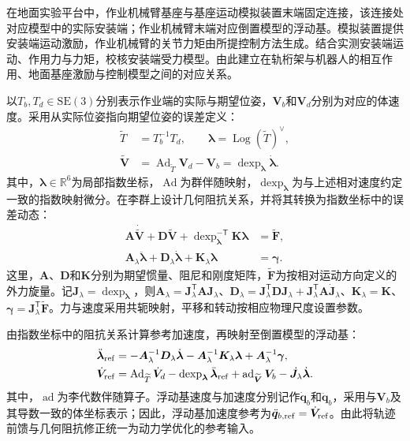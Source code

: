 \documentclass[UTF8,a4paper,zihao=-4,fontset=fandol]{ctexart}
\newcommand{\SE}{\mathrm{SE}(3)}
\begin{document}
在地面实验平台中，作业机械臂基座与基座运动模拟装置末端固定连接，该连接处对应模型中的实际安装端；作业机械臂末端对应倒置模型的浮动基。模拟装置提供安装端运动激励，作业机械臂的关节力矩由所提控制方法生成。结合实测安装端运动、作用力与力矩，校核安装端受力模型。由此建立在轨桁架与机器人的相互作用、地面基座激励与控制模型之间的对应关系。

以$T_b,T_d\in\SE$分别表示作业端的实际与期望位姿，$\bm V_b$和$\bm V_d$分别为对应的体速度。采用从实际位姿指向期望位姿的误差定义：
\begin{equation}
\begin{aligned}
 \widetilde T&=T_b^{-1}T_d,\qquad
 \bm\lambda=\operatorname{Log}(\widetilde T)^\vee,\\
 \widetilde{\bm V}
 &=\operatorname{Ad}_{\widetilde T}\bm V_d-\bm V_b
 =\operatorname{dexp}_{\bm\lambda}\dot{\bm\lambda}.
\end{aligned}
\label{eq:pose_error}
\end{equation}
其中，$\bm\lambda\in\mathbb R^6$为局部指数坐标，$\operatorname{Ad}$为群伴随映射，$\operatorname{dexp}_{\bm\lambda}$为与上述相对速度约定一致的指数映射微分。在李群上设计几何阻抗关系，并将其转换为指数坐标中的误差动态\cite{kim2025}：
\begin{equation}
\begin{aligned}
 \bm A\dot{\widetilde{\bm V}}+\bm D\widetilde{\bm V}
 +\operatorname{dexp}_{\bm\lambda}^{-\mathsf T}\bm K\bm\lambda
 &=\widetilde{\bm F},\\
 \bm A_\lambda\ddot{\bm\lambda}
 +\bm D_\lambda\dot{\bm\lambda}+\bm K_\lambda\bm\lambda
 &=\bm\gamma.
\end{aligned}
\label{eq:impedance}
\end{equation}
这里，$\bm A$、$\bm D$和$\bm K$分别为期望惯量、阻尼和刚度矩阵，$\widetilde{\bm F}$为按相对运动方向定义的外力旋量。记$\bm J_\lambda=\operatorname{dexp}_{\bm\lambda}$，则$\bm A_\lambda=\bm J_\lambda^{\mathsf T}\bm A\bm J_\lambda$、$\bm D_\lambda=\bm J_\lambda^{\mathsf T}\bm D\bm J_\lambda+\bm J_\lambda^{\mathsf T}\bm A\dot{\bm J}_\lambda$、$\bm K_\lambda=\bm K$、$\bm\gamma=\bm J_\lambda^{\mathsf T}\widetilde{\bm F}$。力与速度采用共轭映射，平移和转动按相应物理尺度设置参数。

由指数坐标中的阻抗关系计算参考加速度，再映射至倒置模型的浮动基：
\begin{equation}
\begin{aligned}
 \ddot{\bm\lambda}_{\rm ref}
 &=-\bm A_\lambda^{-1}\bm D_\lambda\dot{\bm\lambda}
   -\bm A_\lambda^{-1}\bm K_\lambda\bm\lambda
   +\bm A_\lambda^{-1}\bm\gamma,\\
 \dot{\bm V}_{\rm ref}
 &=\operatorname{Ad}_{\widetilde T}\dot{\bm V}_d
   -\operatorname{dexp}_{\bm\lambda}\ddot{\bm\lambda}_{\rm ref}
   +\operatorname{ad}_{\widetilde{\bm V}}\bm V_b
   -\dot{\bm J}_\lambda\dot{\bm\lambda}.
\end{aligned}
\label{eq:impedance_reference}
\end{equation}
其中，$\operatorname{ad}$为李代数伴随算子。浮动基速度与加速度分别记作$\dot{\bm q}_b$和$\ddot{\bm q}_b$，采用与$\bm V_b$及其导数一致的体坐标表示；因此，浮动基加速度参考为$\ddot{\bm q}_{b,\rm ref}=\dot{\bm V}_{\rm ref}$。由此将轨迹前馈与几何阻抗修正统一为动力学优化的参考输入。
\end{document}

